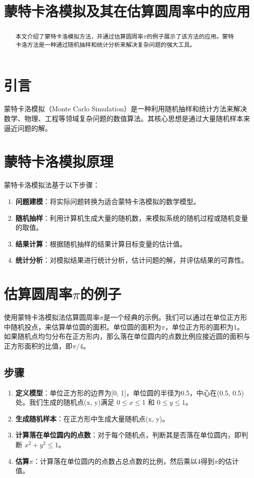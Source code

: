 \documentclass{article}
\title{蒙特卡洛模拟及其在估算圆周率中的应用}
\author{}
\date{}
\begin{document}
\maketitle

\begin{abstract}
本文介绍了蒙特卡洛模拟方法，并通过估算圆周率$\pi$的例子展示了该方法的应用。蒙特卡洛方法是一种通过随机抽样和统计分析来解决复杂问题的强大工具。
\end{abstract}

\section{引言}
蒙特卡洛模拟（Monte Carlo Simulation）是一种利用随机抽样和统计方法来解决数学、物理、工程等领域复杂问题的数值算法。其核心思想是通过大量随机样本来逼近问题的解。

\section{蒙特卡洛模拟原理}
蒙特卡洛模拟法基于以下步骤：
\begin{enumerate}
    \item \textbf{问题建模}：将实际问题转换为适合蒙特卡洛模拟的数学模型。
    \item \textbf{随机抽样}：利用计算机生成大量的随机数，来模拟系统的随机过程或随机变量的取值。
    \item \textbf{结果计算}：根据随机抽样的结果计算目标变量的估计值。
    \item \textbf{统计分析}：对模拟结果进行统计分析，估计问题的解，并评估结果的可靠性。
\end{enumerate}

\section{估算圆周率$\pi$的例子}
使用蒙特卡洛模拟法估算圆周率$\pi$是一个经典的示例。我们可以通过在单位正方形中随机投点，来估算单位圆的面积。单位圆的面积为$\pi$，单位正方形的面积为1。如果随机点均匀分布在正方形内，那么落在单位圆内的点数比例应接近圆的面积与正方形面积的比值，即$\pi/4$。

\subsection{步骤}
\begin{enumerate}
    \item \textbf{定义模型}：单位正方形的边界为[0, 1]，单位圆的半径为0.5，中心在(0.5, 0.5)处。我们生成的随机点(x, y)满足 $0 \leq x \leq 1$ 和 $0 \leq y \leq 1$。
    \item \textbf{生成随机样本}：在正方形中生成大量随机点(x, y)。
    \item \textbf{计算落在单位圆内的点数}：对于每个随机点，判断其是否落在单位圆内，即判断 $x^2 + y^2 \leq 1$。
    \item \textbf{估算$\pi$}：计算落在单位圆内的点数占总点数的比例，然后乘以4得到$\pi$的估计值。
\end{enumerate}
\end{document}
